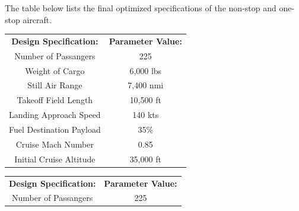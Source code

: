 \documentclass{article}
\begin{document}
        \begin{flushleft}
            The table below lists the final optimized specifications of the non-stop and one-stop aircraft.

            \begin{table}[ht]
                \begin{tabular}{|c|c|}
                \hline
                \rowcolor[HTML]{FFC702}
                \multicolumn{2}{|c|}{\cellcolor[HTML]{FFC702}\textbf{Non-stop Aircraft}} \\ \hline
                \textbf{Design Specification:}        & \textbf{Parameter Value:}        \\ \hline
                Number of Passangers                  & 225                              \\ \hline
                \rowcolor[HTML]{C0C0C0}
                Weight of Cargo                       & 6,000 lbs                        \\ \hline
                Still Air Range                       & 7,400 nmi                        \\ \hline
                \rowcolor[HTML]{C0C0C0}
                Takeoff Field Length                  & 10,500 ft                        \\ \hline
                Landing Approach Speed                & 140 kts                          \\ \hline
                \rowcolor[HTML]{C0C0C0}
                Fuel Destination Payload              & 35\%                             \\ \hline
                Cruise Mach Number                    & 0.85                             \\ \hline
                \rowcolor[HTML]{C0C0C0}
                Initial Cruise Altitude               & 35,000 ft                        \\ \hline
                \end{tabular}
                \quad
                \begin{tabular}{|c|c|}
                    \hline
                    \rowcolor[HTML]{DAE8FC}
                    \multicolumn{2}{|c|}{\cellcolor[HTML]{DAE8FC}\textbf{One-stop Aircraft}} \\ \hline
                    \textbf{Design Specification:}        & \textbf{Parameter Value:}        \\ \hline
                    Number of Passangers                  & 225                              \\ \hline

\end{tabular}
\end{table}
\end{flushleft}
\end{document}
